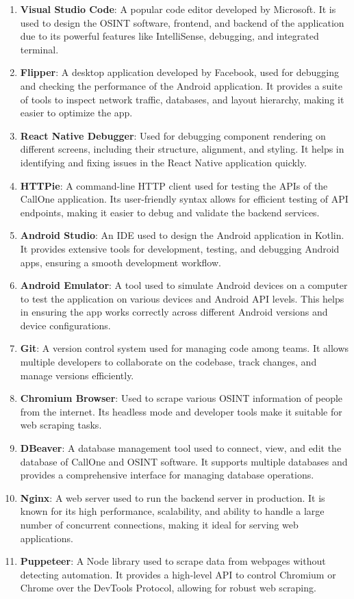 \begin{enumerate}[label=\roman*.]
  \item \textbf{Visual Studio Code}: A popular code editor developed by Microsoft.
  It is used to design the OSINT software, frontend, and backend of the application due to its powerful features like IntelliSense, debugging, and integrated terminal.\cite{VSCode}
  \item \textbf{Flipper}: A desktop application developed by Facebook, used for debugging and checking the performance of the Android application.
  It provides a suite of tools to inspect network traffic, databases, and layout hierarchy, making it easier to optimize the app.\cite{FLP}
  \item \textbf{ React Native Debugger}: Used for debugging component rendering on different screens, including their structure, alignment, and styling.
  It helps in identifying and fixing issues in the React Native application quickly.\cite{RNF}
  \item \textbf{HTTPie}: A command-line HTTP client used for testing the APIs of the CallOne application.
  Its user-friendly syntax allows for efficient testing of API endpoints, making it easier to debug and validate the backend services.\cite{Httpie}
  \item \textbf{Android Studio}: An IDE used to design the Android application in Kotlin.
  It provides extensive tools for development, testing, and debugging Android apps, ensuring a smooth development workflow.\cite{Android Studio}
  \item \textbf{Android Emulator}: A tool used to simulate Android devices on a computer to test the application on various devices and Android API levels.
  This helps in ensuring the app works correctly across different Android versions and device configurations.\cite{Android Studio}
  \item \textbf{Git}: A version control system used for managing code among teams.
  It allows multiple developers to collaborate on the codebase, track changes, and manage versions efficiently.\cite{Git}
  \item \textbf{Chromium Browser}: Used to scrape various OSINT information of people from the internet.
  Its headless mode and developer tools make it suitable for web scraping tasks.\cite{Chromium}
  \item \textbf{DBeaver}: A database management tool used to connect, view, and edit the database of CallOne and OSINT software.
  It supports multiple databases and provides a comprehensive interface for managing database operations.\cite{DBeaver}
  \item \textbf{Nginx}: A web server used to run the backend server in production.
  It is known for its high performance, scalability, and ability to handle a large number of concurrent connections, making it ideal for serving web applications. \cite{Nginx}
  \item \textbf{Puppeteer}: A Node library used to scrape data from webpages without detecting automation.
  It provides a high-level API to control Chromium or Chrome over the DevTools Protocol, allowing for robust web scraping.\cite{Puppeteer}
\end{enumerate}

